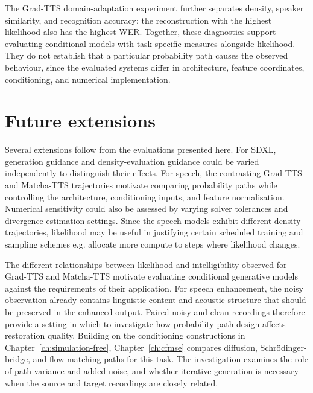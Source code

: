 The Grad-TTS domain-adaptation experiment further separates density, speaker similarity, and recognition accuracy: the reconstruction with the highest likelihood also has the highest \ac{WER}. Together, these diagnostics support evaluating conditional models with task-specific measures alongside likelihood. They do not establish that a particular probability path causes the observed behaviour, since the evaluated systems differ in architecture, feature coordinates, conditioning, and numerical implementation.

\section{Future extensions}
Several extensions follow from the evaluations presented here. For SDXL, generation guidance and density-evaluation guidance could be varied independently to distinguish their effects. For speech, the contrasting Grad-TTS and Matcha-TTS trajectories motivate comparing probability paths while controlling the architecture, conditioning inputs, and feature normalisation. Numerical sensitivity could also be assessed by varying solver tolerances and divergence-estimation settings. Since the speech models exhibit different density trajectories, likelihood may be useful in justifying certain scheduled training and sampling schemes e.g. allocate more compute to steps where likelihood changes.

The different relationships between likelihood and intelligibility observed for Grad-TTS and Matcha-TTS motivate evaluating conditional generative models against the requirements of their application. For speech enhancement, the noisy observation already contains linguistic content and acoustic structure that should be preserved in the enhanced output. Paired noisy and clean recordings therefore provide a setting in which to investigate how probability-path design affects restoration quality. Building on the conditioning constructions in Chapter~\ref{ch:simulation-free}, Chapter~\ref{ch:cfmse} compares diffusion, Schr\"odinger-bridge, and flow-matching paths for this task. The investigation examines the role of path variance and added noise, and whether iterative generation is necessary when the source and target recordings are closely related.


